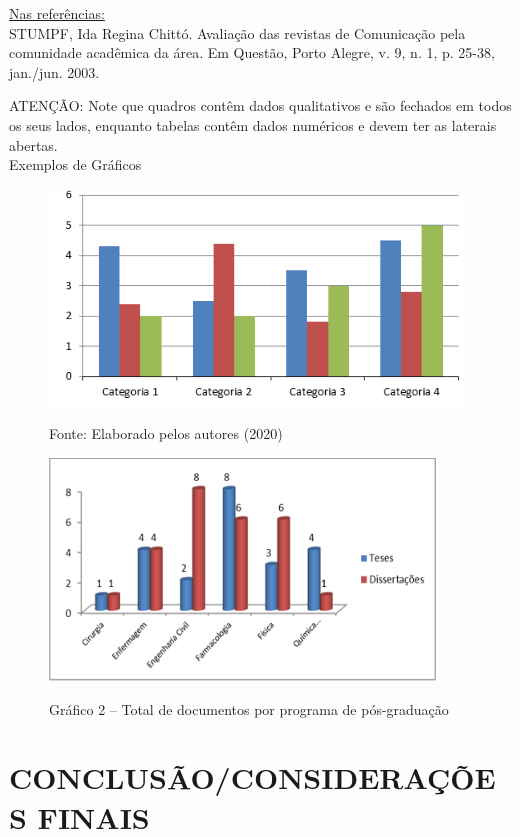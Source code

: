 \documentclass[12pt]{article}
\begin{document}

\underline{Nas referências:} \\

STUMPF, Ida Regina Chittó. Avaliação das revistas de Comunicação pela comunidade acadêmica da área. Em Questão, Porto Alegre, v. 9, n. 1, p. 25-38, jan./jun. 2003.

ATENÇÃO: Note que quadros contêm dados qualitativos e são fechados em todos os seus lados, enquanto tabelas contêm dados numéricos e devem ter as laterais abertas. \\

Exemplos de Gráficos 

\begin{figure}[H]
\centering
\caption{Fonte: Elaborado pelos autores (2020)}
\includegraphics{Fig/graf1.PNG}
{\footnotesize{}} 
\label{graf1}
\end{figure}

\begin{figure}[H]
\centering
\caption{Gráfico 2 – Total de documentos por programa de pós-graduação } %
\includegraphics{Fig/grafico2.PNG}
{\footnotesize{}}
\label{graf2}
\end{figure}


\section{CONCLUSÃO/CONSIDERAÇÕES FINAIS}
\end{document}
